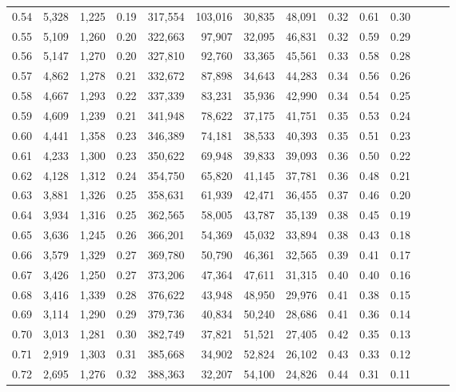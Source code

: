 \begin{tabular}{rrrrrrrrrrrrrr}
0.54 &  5,328 &  1,225 &  0.19 &  317,554 &  103,016 &  30,835 &  48,091 &  0.32 &  0.61 &      0.30 \\
0.55 &  5,109 &  1,260 &  0.20 &  322,663 &   97,907 &  32,095 &  46,831 &  0.32 &  0.59 &      0.29 \\
0.56 &  5,147 &  1,270 &  0.20 &  327,810 &   92,760 &  33,365 &  45,561 &  0.33 &  0.58 &      0.28 \\
0.57 &  4,862 &  1,278 &  0.21 &  332,672 &   87,898 &  34,643 &  44,283 &  0.34 &  0.56 &      0.26 \\
0.58 &  4,667 &  1,293 &  0.22 &  337,339 &   83,231 &  35,936 &  42,990 &  0.34 &  0.54 &      0.25 \\
0.59 &  4,609 &  1,239 &  0.21 &  341,948 &   78,622 &  37,175 &  41,751 &  0.35 &  0.53 &      0.24 \\
0.60 &  4,441 &  1,358 &  0.23 &  346,389 &   74,181 &  38,533 &  40,393 &  0.35 &  0.51 &      0.23 \\
0.61 &  4,233 &  1,300 &  0.23 &  350,622 &   69,948 &  39,833 &  39,093 &  0.36 &  0.50 &      0.22 \\
0.62 &  4,128 &  1,312 &  0.24 &  354,750 &   65,820 &  41,145 &  37,781 &  0.36 &  0.48 &      0.21 \\
0.63 &  3,881 &  1,326 &  0.25 &  358,631 &   61,939 &  42,471 &  36,455 &  0.37 &  0.46 &      0.20 \\
0.64 &  3,934 &  1,316 &  0.25 &  362,565 &   58,005 &  43,787 &  35,139 &  0.38 &  0.45 &      0.19 \\
0.65 &  3,636 &  1,245 &  0.26 &  366,201 &   54,369 &  45,032 &  33,894 &  0.38 &  0.43 &      0.18 \\
0.66 &  3,579 &  1,329 &  0.27 &  369,780 &   50,790 &  46,361 &  32,565 &  0.39 &  0.41 &      0.17 \\
0.67 &  3,426 &  1,250 &  0.27 &  373,206 &   47,364 &  47,611 &  31,315 &  0.40 &  0.40 &      0.16 \\
0.68 &  3,416 &  1,339 &  0.28 &  376,622 &   43,948 &  48,950 &  29,976 &  0.41 &  0.38 &      0.15 \\
0.69 &  3,114 &  1,290 &  0.29 &  379,736 &   40,834 &  50,240 &  28,686 &  0.41 &  0.36 &      0.14 \\
0.70 &  3,013 &  1,281 &  0.30 &  382,749 &   37,821 &  51,521 &  27,405 &  0.42 &  0.35 &      0.13 \\
0.71 &  2,919 &  1,303 &  0.31 &  385,668 &   34,902 &  52,824 &  26,102 &  0.43 &  0.33 &      0.12 \\
0.72 &  2,695 &  1,276 &  0.32 &  388,363 &   32,207 &  54,100 &  24,826 &  0.44 &  0.31 &      0.11 \\

\end{tabular}
